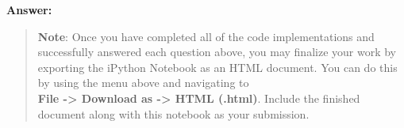 \documentclass[11pt]{article}
\begin{document}
    \textbf{Answer:}

    \begin{quote}
\textbf{Note}: Once you have completed all of the code implementations
and successfully answered each question above, you may finalize your
work by exporting the iPython Notebook as an HTML document. You can do
this by using the menu above and navigating to\\
\textbf{File -\textgreater{} Download as -\textgreater{} HTML (.html)}.
Include the finished document along with this notebook as your
submission.
\end{quote}


    
    
    
    
\end{document}

